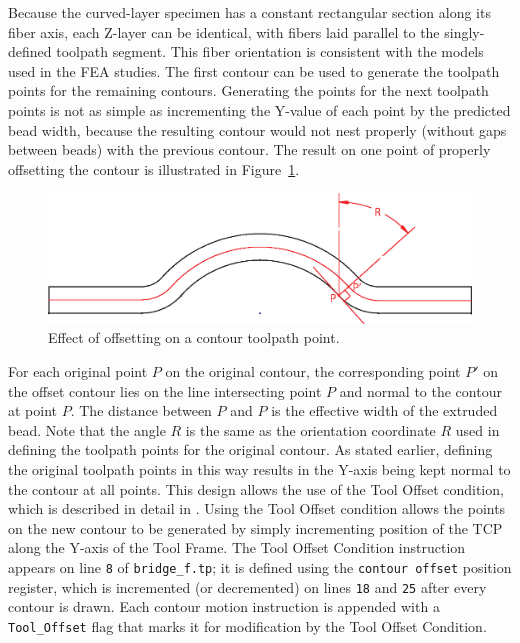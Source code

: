 Because the curved-layer specimen has a constant rectangular section along its fiber axis, each Z-layer can be identical, with fibers laid parallel to the singly-defined toolpath segment. This fiber orientation is consistent with the models used in the FEA studies. The first contour can be used to generate the toolpath points for the remaining contours. Generating the points for the next toolpath points is not as simple as incrementing the Y-value of each point by the predicted bead width, because the resulting contour would not nest properly (without gaps between beads) with the previous contour. The result on one point of properly offsetting the contour is illustrated in Figure~\ref{fig:pt-offset}. 

\begin{figure}
    \centering
    \includegraphics[width=.8\linewidth]{figures/point-offset-diagram}
    \caption{Effect of offsetting on a contour toolpath point.}
    \label{fig:pt-offset}
\end{figure}

For each original point \(P\) on the original contour, the corresponding point \(P'\) on the offset contour lies on the line intersecting point \(P\) and normal to the contour at point \(P\). The distance between \(P\) and \(P\) is the effective width of the extruded bead. Note that the angle \(R\) is the same as the orientation coordinate \(R\) used in defining the toolpath points for the original contour. As stated earlier, defining the original toolpath points in this way results in the Y-axis being kept normal to the contour at all points. This design allows the use of the Tool Offset condition, which is described in detail in \cite[sec~4.11]{lr-handling-tool}. Using the Tool Offset condition allows the points on the new contour to be generated by simply incrementing position of the TCP along the Y-axis of the Tool Frame. The Tool Offset Condition instruction appears on line \verb|8| of \verb|bridge_f.tp|; it is defined using the \verb|contour offset| position register, which is incremented (or decremented) on lines \verb|18| and \verb|25| after every contour is drawn. Each contour motion instruction is appended with a \verb|Tool_Offset| flag that marks it for modification by the Tool Offset Condition.


